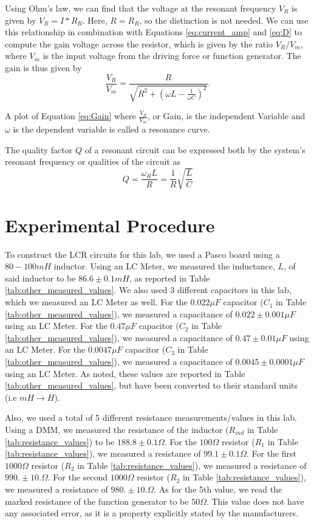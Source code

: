 \documentclass[12pt]{article}
\newcommand{\paren}[1]{\left( {#1} \right)}
\begin{document}
Using Ohm's law, we can find that the voltage at the resonant frequency $V_R$ is given by $V_R=I * R_R$. Here, $R=R_R$, so the distinction is not needed. We can use this relationship in combination with Equations \ref{eq:current_amp} and \ref{eq:D} to compute the gain voltage across the resistor, which is given by the ratio $V_R/V_m$, where $V_m$ is the input voltage from the driving force or function generator. The gain is thus given by
\begin{equation}
	\frac{V_R}{V_m}=\frac{R}{\sqrt{R^2+\paren{\omega L - \frac{1}{\omega C}}^2}}. \label{eq:Gain}
\end{equation}

A plot of Equation \ref{eq:Gain} where $\frac{V_R}{V_m}$, or Gain, is the independent Variable and $\omega$ is the dependent variable is called a resonance curve. 

The quality factor $Q$ of a resonant circuit can be expressed both by the system's resonant frequency or qualities of the circuit as
\begin{equation}
	Q=\frac{\omega_R L}{R}=\frac{1}{R}\sqrt{\frac{L}{C}}\label{eq:Q_expressions}
\end{equation}
\section{Experimental Procedure}
To construct the LCR circuits for this lab, we used a Pasco board using a $80-100mH$ inductor. Using an LC Meter, we measured the inductance, $L$, of said inductor to be $86.6\pm0.1mH$, as reported in Table \ref{tab:other_measured_values}. We also used 3 different capacitors in this lab, which we measured an LC Meter as well. For the $0.022\mu F$ capacitor ($C_1$ in Table \ref{tab:other_measured_values}), we measured a capacitance of $0.022\pm0.001\mu F$ using an LC Meter. For the $0.47\mu F$ capacitor ($C_2$ in Table \ref{tab:other_measured_values}), we measured a capacitance of $0.47\pm0.01\mu F$ using an LC Meter. For the $0.0047\mu F$ capacitor ($C_3$ in Table \ref{tab:other_measured_values}), we measured a capacitance of $0.0045\pm0.0001\mu F$ using an LC Meter. As noted, these values are reported in Table \ref{tab:other_measured_values}, but have been converted to their standard units (i.e $mH\to H$).

Also, we used a total of 5 different resistance measurements/values in this lab. Using a DMM, we measured the resistance of the inductor ($R_{ind}$ in Table \ref{tab:resistance_values}) to be $188.8\pm0.1\Omega$. For the $100\Omega$ resistor ($R_1$ in Table \ref{tab:resistance_values}), we measured a resistance of $99.1\pm0.1\Omega$. For the first $1000\Omega$ resistor ($R_2$ in Table \ref{tab:resistance_values}), we measured a resistance of $990.\pm10.\Omega$. For the second $1000\Omega$ resistor ($R_2$ in Table \ref{tab:resistance_values}), we measured a resistance of $980.\pm10.\Omega$. As for the 5th value, we read the marked resistance of the function generator to be $50\Omega$. This value does not have any associated error, as it is a property explicitly stated by the manufacturers.
\end{document}
